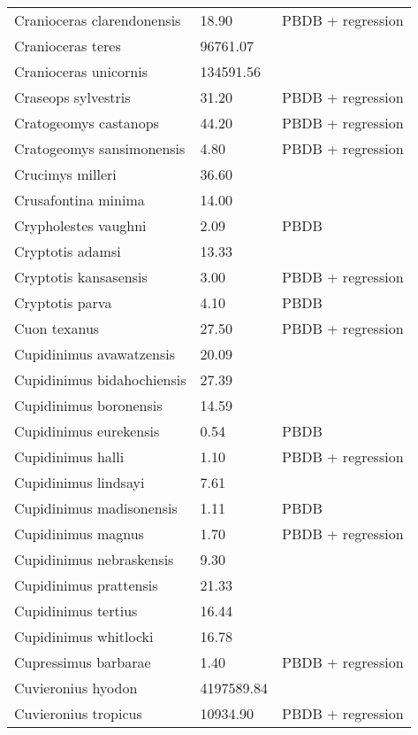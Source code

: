 \begin{longtable}{p{} p{} p{}}
    Cranioceras clarendonensis & 18.90 & PBDB + regression \\ 
    Cranioceras teres & 96761.07 & \cite{Tomiya2013} \\ 
    Cranioceras unicornis & 134591.56 & \cite{Tomiya2013} \\ 
    Craseops sylvestris & 31.20 & PBDB + regression \\ 
    Cratogeomys castanops & 44.20 & PBDB + regression \\ 
    Cratogeomys sansimonensis & 4.80 & PBDB + regression \\ 
    Crucimys milleri & 36.60 & \cite{Tomiya2013} \\ 
    Crusafontina minima & 14.00 & \cite{McKenna2011} \\ 
    Crypholestes vaughni & 2.09 & PBDB \\ 
    Cryptotis adamsi & 13.33 & \cite{Tomiya2013} \\ 
    Cryptotis kansasensis & 3.00 & PBDB + regression \\ 
    Cryptotis parva & 4.10 & PBDB \\ 
    Cuon texanus & 27.50 & PBDB + regression \\ 
    Cupidinimus avawatzensis & 20.09 & \cite{Tomiya2013} \\ 
    Cupidinimus bidahochiensis & 27.39 & \cite{Tomiya2013} \\ 
    Cupidinimus boronensis & 14.59 & \cite{Tomiya2013} \\ 
    Cupidinimus eurekensis & 0.54 & PBDB \\ 
    Cupidinimus halli & 1.10 & PBDB + regression \\ 
    Cupidinimus lindsayi & 7.61 & \cite{Tomiya2013} \\ 
    Cupidinimus madisonensis & 1.11 & PBDB \\ 
    Cupidinimus magnus & 1.70 & PBDB + regression \\ 
    Cupidinimus nebraskensis & 9.30 & \cite{Tomiya2013} \\ 
    Cupidinimus prattensis & 21.33 & \cite{Tomiya2013} \\ 
    Cupidinimus tertius & 16.44 & \cite{Tomiya2013} \\ 
    Cupidinimus whitlocki & 16.78 & \cite{Tomiya2013} \\ 
    Cupressimus barbarae & 1.40 & PBDB + regression \\ 
    Cuvieronius hyodon & 4197589.84 & \cite{Raia2012f} \\ 
    Cuvieronius tropicus & 10934.90 & PBDB + regression \\ 

\end{longtable}
